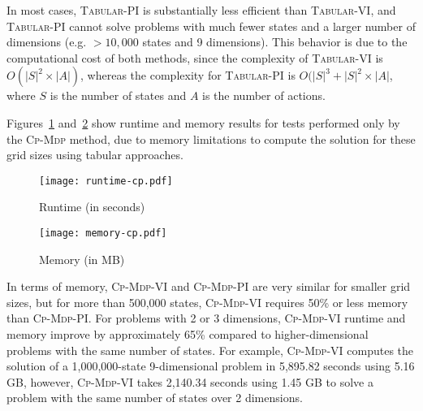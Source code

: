 \documentclass[letterpaper]{article} %
\newcommand\cpmdp{\textsc{Cp-Mdp}}
\newcommand\tabularpi{\textsc{Tabular-PI}}
\newcommand\tabularvi{\textsc{Tabular-VI}}
\newcommand\cpmdppi{\textsc{Cp-Mdp-PI}}
\newcommand\cpmdpvi{\textsc{Cp-Mdp-VI}}
\begin{document}
In most cases, \tabularpi{} is substantially less efficient than \tabularvi{}, and \tabularpi{} cannot solve problems with much fewer states and a larger number of dimensions (e.g. $> 10,000$ states and 9 dimensions).
This behavior is due to the computational cost of both methods, since the complexity of \tabularvi{} is $O(|S|^2 \times |A|)$, whereas the complexity for \tabularpi{} is $O(|S|^3 + |S|^2 \times |A|$, where $S$ is the number of states and $A$ is the number of actions. %

Figures~\ref{fig:runtime-cp} and~\ref{fig:memory-cp} show runtime and memory results for tests performed only by the \cpmdp{} method, due to memory limitations to compute the solution for these grid sizes using tabular approaches. 
\begin{figure*}[htb]
 \centering
 \begin{subfigure}[]{0.48\textwidth}
 \centering
 \texttt{[image: runtime-cp.pdf]}
 \caption{Runtime (in seconds)}
 \label{fig:runtime-cp}
 \end{subfigure}
 \begin{subfigure}[]{0.48\textwidth}
 \centering
 \texttt{[image: memory-cp.pdf]}
 \caption{Memory (in MB)}
 \label{fig:memory-cp}
 \end{subfigure}
 \caption{\cpmdp{} runtime (a) and necessary memory (b) to compute large grid sizes using the value and policy iteration.}
 \label{fig:memory-runtime-cp}
\end{figure*}
In terms of memory, \cpmdpvi{} and \cpmdppi{} are very similar for smaller grid sizes, but for more than 500,000 states, \cpmdpvi{} requires 50\% or less memory than \cpmdppi{}.
For problems with 2 or 3 dimensions, \cpmdpvi{} runtime and memory improve by approximately 65\% compared to higher-dimensional problems with the same number of states.  
For example, \cpmdpvi{} computes the solution of a 1,000,000-state 9-dimensional problem in 5,895.82 seconds using 5.16 GB, however, \cpmdpvi{} takes 2,140.34 seconds using 1.45 GB to solve a problem with the same number of states over 2 dimensions.
\end{document}
